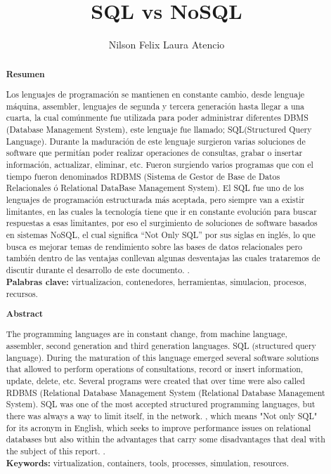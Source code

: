 \documentclass[%
 reprint,
 amsmath,amssymb,
 aps,
]{revtex4-1}
\begin{document}
\title{SQL vs NoSQL}
\author{Nilson Felix Laura Atencio}

%

\begin{abstract}
\begin{center}
\textbf{Resumen}
\end{center}

Los lenguajes de programación se mantienen en constante cambio, desde lenguaje máquina, assembler, lenguajes de segunda y tercera generación hasta llegar a una cuarta, la cual comúnmente fue utilizada para poder administrar diferentes DBMS (Database Management System), este lenguaje fue llamado; SQL(Structured Query Language). Durante la maduración de este lenguaje surgieron varias soluciones de software que permitían poder realizar operaciones de consultas, grabar o insertar información, actualizar, eliminar, etc. Fueron surgiendo varios programas que con el tiempo fueron denominados RDBMS (Sistema de Gestor de Base de Datos Relacionales ó Relational DataBase Management System).
El SQL fue uno de los lenguajes de programación estructurada más aceptada, pero siempre van a existir limitantes, en las cuales la tecnología tiene que ir en constante evolución para buscar respuestas a esas limitantes, por eso el surgimiento de soluciones de software basados en sistemas NoSQL, el cual significa “Not Only SQL” por sus siglas en inglés, lo que busca es mejorar temas de rendimiento sobre las bases de datos relacionales pero también dentro de las ventajas conllevan algunas desventajas las cuales trataremos de discutir durante el desarrollo de este documento.
.\\

\textbf{Palabras clave:}   virtualizacion, contenedores, herramientas, simulacion, procesos, recursos.\\

\begin{center}
\textbf{Abstract}
\end{center}
The programming languages are in constant change, from machine language, assembler, second generation and third generation languages. SQL (structured query language). During the maturation of this language emerged several software solutions that allowed to perform operations of consultations, record or insert information, update, delete, etc. Several programs were created that over time were also called RDBMS (Relational Database Management System (Relational Database Management System). SQL was one of the most accepted structured programming languages, but there was always a way to limit itself, in the network. , which means "Not only SQL" for its acronym in English, which seeks to improve performance issues on relational databases but also within the advantages that carry some disadvantages that deal with the subject of this report. .\\
\textbf{Keywords:}   virtualization, containers, tools, processes, simulation, resources.\\

\end{abstract}
\end{document}
